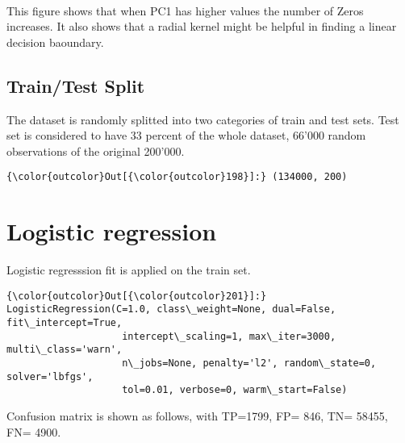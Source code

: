 \documentclass[11pt]{article}
\begin{document}
    \begin{center}
    \end{center}
    { \hspace*{\fill} \\}
    
    This figure shows that when PC1 has higher values the number of Zeros
increases. It also shows that a radial kernel might be helpful in
finding a linear decision baoundary.

    \hypertarget{traintest-split}{%
\subsection{Train/Test Split}\label{traintest-split}}

    The dataset is randomly splitted into two categories of train and test
sets. Test set is considered to have 33 percent of the whole dataset,
66'000 random observations of the original 200'000.

\begin{Verbatim}[commandchars=\\\{\}]
{\color{outcolor}Out[{\color{outcolor}198}]:} (134000, 200)
\end{Verbatim}
            
    \hypertarget{logistic-regression}{%
\section{Logistic regression}\label{logistic-regression}}

    Logistic regresssion fit is applied on the train set.

\begin{Verbatim}[commandchars=\\\{\}]
{\color{outcolor}Out[{\color{outcolor}201}]:} LogisticRegression(C=1.0, class\_weight=None, dual=False, fit\_intercept=True,
                    intercept\_scaling=1, max\_iter=3000, multi\_class='warn',
                    n\_jobs=None, penalty='l2', random\_state=0, solver='lbfgs',
                    tol=0.01, verbose=0, warm\_start=False)
\end{Verbatim}
            
    Confusion matrix is shown as follows, with TP=1799, FP= 846, TN= 58455,
FN= 4900.

    \begin{center}
    \end{center}
    { \hspace*{\fill} \\}
    
\end{document}
